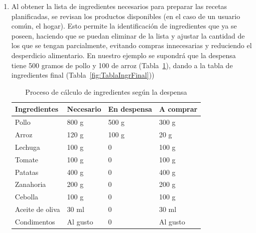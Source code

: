\documentclass[twoside, openright, 11pt]{report}
\begin{document}
\begin{enumerate}
	  	
	  	\item Al obtener la lista de ingredientes necesarios para preparar las recetas planificadas, se revisan los productos disponibles (en el caso de un usuario común, el hogar). Esto permite la identificación de ingredientes que ya se poseen, haciendo que se puedan eliminar de la lista y ajustar la cantidad de los que se tengan parcialmente, evitando compras innecesarias y reduciendo el desperdicio alimentario. En nuestro ejemplo se supondrá que la despensa tiene 500 gramos de pollo y 100 de arroz (Tabla~\ref{fig:TablaCalculoIngr}), dando a la tabla de ingredientes final (Tabla~\ref{fig:TablaIngrFinal}))
	  	
	  	
	  	\begin{table}[H]
	  		\label{fig:TablaCalculoIngr}
	  		\centering
	  		\caption{Proceso de cálculo de ingredientes según la despensa}
	  		\begin{tabular}{|p{3cm}|p{3cm}|p{3cm}|p{3cm}|}
	  			\hline
	  			\textbf{Ingredientes} & \textbf{Necesario} & \textbf{En despensa} & \textbf{A comprar} \\ \hline
	  			Pollo & 800 g & 500 g & 300 g \\ \hline
	  			Arroz & 120 g & 100 g & 20 g \\ \hline
	  			Lechuga & 100 g & 0 & 100 g \\ \hline
	  			Tomate & 100 g & 0 & 100 g \\ \hline
	  			Patatas & 400 g & 0 & 400 g \\ \hline
	  			Zanahoria & 200 g & 0 & 200 g \\ \hline
	  			Cebolla & 100 g & 0 & 100 g \\ \hline
	  			Aceite de oliva & 30 ml & 0 & 30 ml \\ \hline
	  			Condimentos & Al gusto & 0 & Al gusto \\ \hline
	  		\end{tabular}
	  	\end{table}
	  	
	  	

\end{enumerate}
\end{document}
